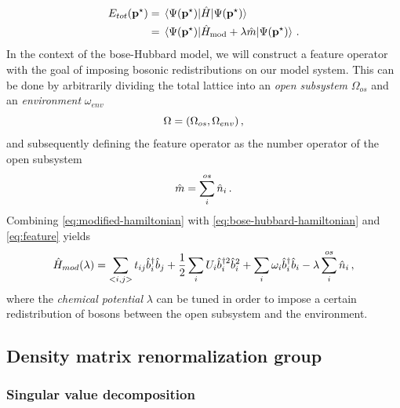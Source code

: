 \documentclass[twoside,twocolumn,9pt]{article}
\begin{document}
\begin{align}
  \begin{split}
    E_{tot}(\vb{p}^\star)
    &= \ev*{\hat{H}}{\Psi(\vb{p}^\star)} \\ 
    &= \ev*{\hat{H}_{\text{mod}} + \lambda\hat{m}}{\Psi(\vb{p}^\star)}
    \thinspace .
  \end{split}
\end{align}
In the context of the bose-Hubbard model, we will construct a feature operator with the goal of imposing bosonic redistributions on our model system. This can be done by arbitrarily dividing the total lattice into an \emph{open subsystem} $\Omega_{os}$ and an \emph{environment} $\omega_{env}$
\begin{equation}
  \Omega = (\Omega_{os}, \Omega_{env}) \thinspace ,
\end{equation} 
and subsequently defining the feature operator as the number operator of the open subsystem
\begin{equation}
  \hat{m} = \sum_i^{os}\hat{n}_i \thinspace .
  \label{eq:feature}
\end{equation}
Combining \cref{eq:modified-hamiltonian} with \cref{eq:bose-hubbard-hamiltonian} and \cref{eq:feature} yields
\begin{equation}
  \hat{H}_{mod}(\lambda) = \sum_{<i,j>} t_{ij}\hat{b}_i^\dagger \hat{b}_j + \frac{1}{2}\sum_i U_i\hat{b}_i^{\dagger 2} \hat{b}_i^{2} + \sum_i \omega_i \hat{b}_i^\dagger \hat{b}_i - \lambda\sum_i^{os}\hat{n}_i \thinspace ,
\end{equation}
where the \emph{chemical potential} $\lambda$ can be tuned in order to impose a certain redistribution of bosons between the open subsystem and the environment.

\subsection{Density matrix renormalization group}
\subsubsection{Singular value decomposition}
\end{document}
